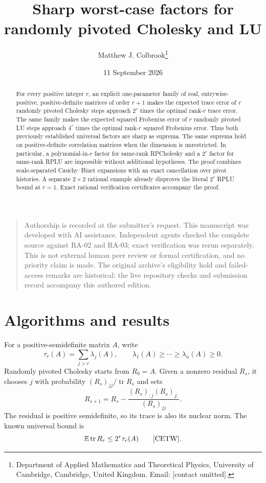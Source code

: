 \documentclass[11pt]{article}
\title{Sharp worst-case factors for randomly pivoted Cholesky and LU}
\author{Matthew J. Colbrook\thanks{Department of Applied Mathematics and Theoretical Physics, University of Cambridge, Cambridge, United Kingdom. Email: [contact omitted].}}
\date{11 September 2026}
\theoremstyle{remark}
\DeclareMathOperator{\tr}{tr}
\newcommand{\E}{\mathbb E}
\begin{document}
\maketitle

\begin{quote}\small
Authorship is recorded at the submitter's request. This manuscript was developed with AI assistance. Independent agents checked the complete source against RA-02 and RA-03; exact verification was rerun separately. This is not external human peer review or formal certification, and no priority claim is made. The original archive's eligibility hold and failed-access remarks are historical: the live repository checks and submission record accompany this authored edition.
\end{quote}
\begin{abstract}
For every positive integer $r$, an explicit one-parameter family of real,
entrywise-positive, positive-definite matrices of order $r+1$ makes the expected
trace error of $r$ randomly pivoted Cholesky steps approach $2^r$ times the optimal
rank-$r$ trace error. The same family makes the expected squared Frobenius error
of $r$ randomly pivoted LU steps approach $4^r$ times the optimal rank-$r$
squared Frobenius error. Thus both previously established universal factors are
sharp as suprema. The same suprema hold on positive-definite correlation
matrices when the dimension is unrestricted. In particular, a polynomial-in-$r$ factor for same-rank
RPCholesky and a $2^r$ factor for same-rank RPLU are impossible without additional
hypotheses. The proof combines scale-separated Cauchy--Binet expansions with an
exact cancellation over pivot histories. A separate $2\times2$ rational example
already disproves the literal $2^r$ RPLU bound at $r=1$. Exact rational
verification certificates accompany the proof.
\end{abstract}

\section{Algorithms and results}

For a positive-semidefinite matrix $A$, write
\[
 \tau_r(A)=\sum_{j>r}\lambda_j(A),
 \qquad \lambda_1(A)\ge\cdots\ge\lambda_n(A)\ge0.
\]
Randomly pivoted Cholesky starts from $R_0=A$. Given a nonzero residual $R_s$,
it chooses $j$ with probability $(R_s)_{jj}/\tr R_s$ and sets
\begin{equation}\label{eq:chol-update}
 R_{s+1}=R_s-\frac{(R_s)_{:j}(R_s)_{j:}}{(R_s)_{jj}}.
\end{equation}
The residual is positive semidefinite, so its trace is also its nuclear norm.
The known universal bound is
\begin{equation}\label{eq:known-chol}
 \E\tr R_r\le 2^r\tau_r(A)
 \qquad\text{\cite[Lemma 5.5]{CETW}}.
\end{equation}
\end{document}
